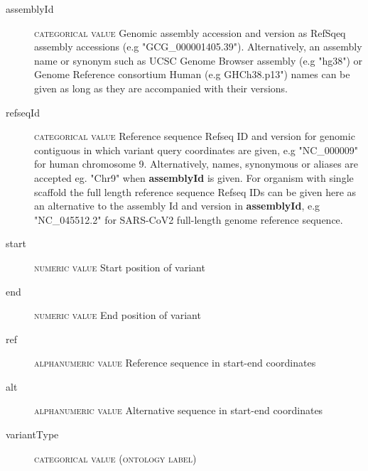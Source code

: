 \documentclass[a4paper, 10pt]{article}        %
\begin{document}
\begin{description}
	\item[assemblyId] {\textsc{categorical value}} Genomic assembly accession and version as RefSqeq assembly accessions (e.g "GCG\_000001405.39"). Alternatively, an assembly name or synonym such as UCSC Genome Browser assembly (e.g "hg38") or Genome Reference consortium Human (e.g GHCh38.p13") names can be given as long as they are accompanied with their versions. 
 	\item[refseqId] {\textsc{categorical value}} Reference sequence Refseq ID and version for genomic contiguous in which variant query coordinates are given, e.g "NC\_000009" for human chromosome 9. Alternatively, names, synonymous or aliases are accepted eg. "Chr9" when \textbf{assemblyId} is given. For organism with single scaffold the full length reference sequence Refseq IDs can be given here as an alternative to the assembly Id and version in \textbf{assemblyId}, e.g "NC\_045512.2" for SARS-CoV2 full-length genome reference sequence. 
	\item[start] {\textsc{numeric value}} Start position of variant
	\item[end] {\textsc{numeric value}} End position of variant %
	\item[ref] {\textsc{alphanumeric value}} Reference sequence in start-end coordinates
	\item[alt] {\textsc{alphanumeric value}} Alternative sequence in start-end coordinates
	\item[variantType] {\textsc{categorical value (ontology label)}}
 \end{description}
 
\end{document}
